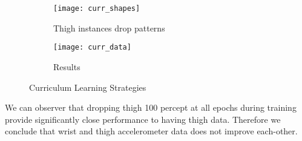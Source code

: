 \begin{figure}[!ht]
\centering
\begin{subfigure}{.5\textwidth}
  	\centering
  	\texttt{[image: curr\_shapes]}
	\caption{Thigh instances drop patterns}
	\label{fig:CLdrop}
\end{subfigure}%
\begin{subfigure}{.5\textwidth}
  	\centering
	\texttt{[image: curr\_data]}
	\caption{Results}
	\label{fig:CLresult}
\end{subfigure}
\caption{Curriculum Learning Strategies}
\label{fig:test}
\end{figure}

We can observer that dropping thigh 100 percept at all epochs during training provide significantly close performance to having thigh data. Therefore we conclude that wrist and thigh accelerometer data does not improve each-other. 

\clearpage
